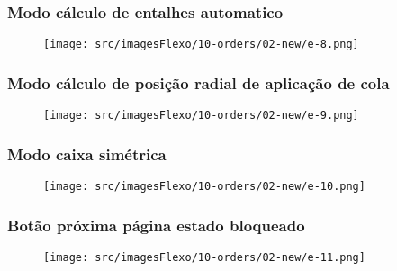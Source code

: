 \newpage
\thispagestyle{fancy}
\vspace*{40 pt}
\subsubsection{\small{Modo cálculo de entalhes automatico}}
\vspace*{\fill}
\begin{figure}[h]
  \centering
  \texttt{[image: src/imagesFlexo/10-orders/02-new/e-8.png]}
\end{figure}
\vspace*{\fill}

\newpage
\thispagestyle{fancy}
\vspace*{40 pt}
\subsubsection{\small{Modo cálculo de posição	radial de aplicação de cola}}
\vspace*{\fill}
\begin{figure}[h]
  \centering
  \texttt{[image: src/imagesFlexo/10-orders/02-new/e-9.png]}
\end{figure}
\vspace*{\fill}

\newpage
\thispagestyle{fancy}
\vspace*{40 pt}
\subsubsection{\small{Modo caixa simétrica}}
\vspace*{\fill}
\begin{figure}[h]
  \centering
  \texttt{[image: src/imagesFlexo/10-orders/02-new/e-10.png]}
\end{figure}
\vspace*{\fill}

\newpage
\thispagestyle{fancy}
\vspace*{40 pt}
\subsubsection{\small{Botão próxima página estado bloqueado}}
\vspace*{\fill}
\begin{figure}[h]
  \centering
  \texttt{[image: src/imagesFlexo/10-orders/02-new/e-11.png]}
\end{figure}
\vspace*{\fill}